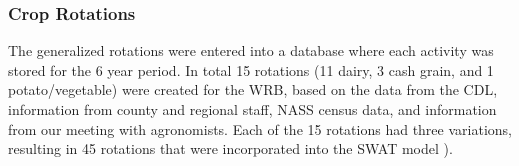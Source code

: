 \subsubsection{Crop Rotations}

The generalized rotations were entered into a database where each activity was stored for the 6 year
period. In total 15 rotations (11 dairy, 3 cash grain, and 1 potato/vegetable) were created for the WRB,
based on the data from the CDL, information from county and regional staff, NASS census data, and
information from our meeting with agronomists. Each of the 15 rotations had three
variations, resulting in 45 rotations that were incorporated into the SWAT model \citep{wdnr_landcover_2014}).